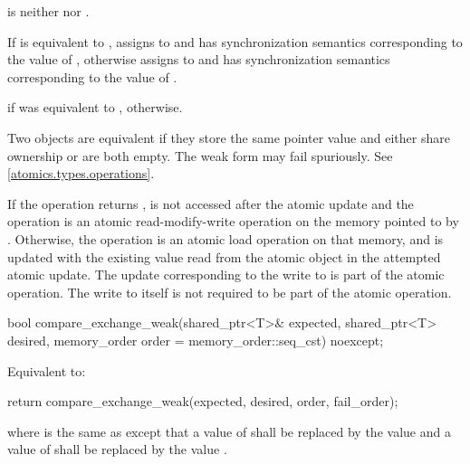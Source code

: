 \begin{itemdescr}
\pnum
\expects
{} is neither
 nor .

\pnum
\effects
If  is equivalent to ,
assigns  to  and
has synchronization semantics corresponding to the value of ,
otherwise assigns  to  and
has synchronization semantics corresponding to the value of .

\pnum
\returns
{} if  was equivalent to ,
 otherwise.

\pnum
\remarks
Two  objects are equivalent if
they store the same pointer value and
either share ownership or are both empty.
The weak form may fail spuriously. See \ref{atomics.types.operations}.

\pnum
If the operation returns ,
 is not accessed after the atomic update and
the operation is an atomic read-modify-write operation
on the memory pointed to by .
Otherwise, the operation is an atomic load operation on that memory, and
 is updated with the existing value
read from the atomic object in the attempted atomic update.
The  update corresponding to the write to 
is part of the atomic operation.
The write to  itself
is not required to be part of the atomic operation.
\end{itemdescr}

%
\begin{itemdecl}
bool compare_exchange_weak(shared_ptr<T>& expected, shared_ptr<T> desired,
                           memory_order order = memory_order::seq_cst) noexcept;
\end{itemdecl}

\begin{itemdescr}
\pnum
\effects
Equivalent to:
\begin{codeblock}
return compare_exchange_weak(expected, desired, order, fail_order);
\end{codeblock}
where  is the same as 
except that a value of 
shall be replaced by the value  and
a value of 
shall be replaced by the value .
\end{itemdescr}

